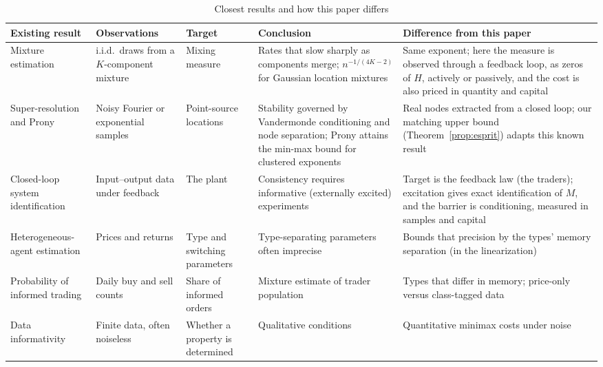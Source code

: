 \documentclass[12pt]{article}
\theoremstyle{definition}
\theoremstyle{remark}
\begin{document}
\begin{table}[!htbp]\centering\footnotesize
\begin{threeparttable}
\caption{Closest results and how this paper differs}\label{tab:closest}
\setlength{\tabcolsep}{3pt}
\begin{tabular}{*{5}{>{\raggedright\arraybackslash}p{}}}
\toprule
Existing result & Observations & Target & Conclusion & Difference from this paper\\
\midrule
Mixture estimation \citep{heinrich2018,wu2020} & i.i.d.\ draws from a $K$-component mixture & Mixing measure & Rates that slow sharply as components merge; $n^{-1/(4K-2)}$ for Gaussian location mixtures & Same exponent; here the measure is observed through a feedback loop, as zeros of $H$, actively or passively, and the cost is also priced in quantity and capital\\
Super-resolution and Prony \citep{moitra2015,batenkov2021,katz2023} & Noisy Fourier or exponential samples & Point-source locations & Stability governed by Vandermonde conditioning and node separation; Prony attains the min-max bound for clustered exponents & Real nodes extracted from a closed loop; our matching upper bound (Theorem~\ref{prop:esprit}) adapts this known result\\
Closed-loop system identification \citep{ljung1999,forssell1999} & Input--output data under feedback & The plant & Consistency requires informative (externally excited) experiments & Target is the feedback law (the traders); excitation gives exact identification of $M$, and the barrier is conditioning, measured in samples and capital\\
Heterogeneous-agent estimation \citep{brock1998,franke2012,kukacka2017} & Prices and returns & Type and switching parameters & Type-separating parameters often imprecise & Bounds that precision by the types' memory separation (in the linearization)\\
Probability of informed trading \citep{easley1996} & Daily buy and sell counts & Share of informed orders & Mixture estimate of trader population & Types that differ in memory; price-only versus class-tagged data\\
Data informativity \citep{vanwaarde2020} & Finite data, often noiseless & Whether a property is determined & Qualitative conditions & Quantitative minimax costs under noise\\
\bottomrule
\end{tabular}
\end{threeparttable}
\end{table}
\end{document}
